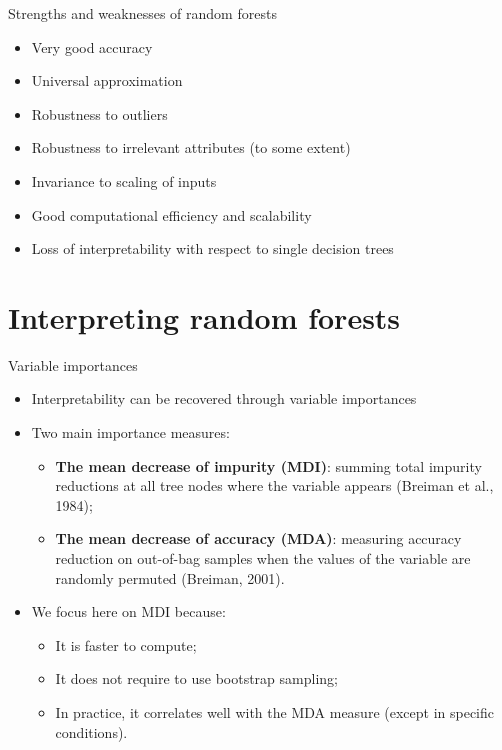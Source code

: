 \documentclass{beamer}
\begin{document}
\begin{frame}{Strengths and weaknesses of random forests}

\begin{itemize}
\item Very good accuracy
\item Universal approximation
\item Robustness to outliers
\item Robustness to irrelevant attributes (to some extent)
\item Invariance to scaling of inputs
\item Good computational efficiency and scalability

\bigskip

\item<2> \alert{Loss of interpretability with respect to single decision trees}
\end{itemize}

\end{frame}



\section{Interpreting random forests}


\begin{frame}{Variable importances}

\begin{itemize}
\item Interpretability can be recovered through {\color{blue}variable importances}

\bigskip

\item Two main importance measures:
    \begin{itemize}
    \item {\bf The mean decrease of impurity (MDI)}: summing total impurity reductions
      at all tree nodes where the variable appears {\scriptsize (Breiman et al., 1984)};
    \item {\bf The mean decrease of accuracy (MDA)}: measuring
      accuracy reduction on out-of-bag samples when the values of the
      variable are randomly permuted {\scriptsize (Breiman, 2001)}.
    \end{itemize}

\bigskip

\item We focus here on MDI because:
\begin{itemize}
\item It is faster to compute;
\item It does not require to use bootstrap sampling;
\item In practice, it correlates well with the MDA
  measure (except in specific conditions).
\end{itemize}

\end{itemize}
\end{frame}
\end{document}

